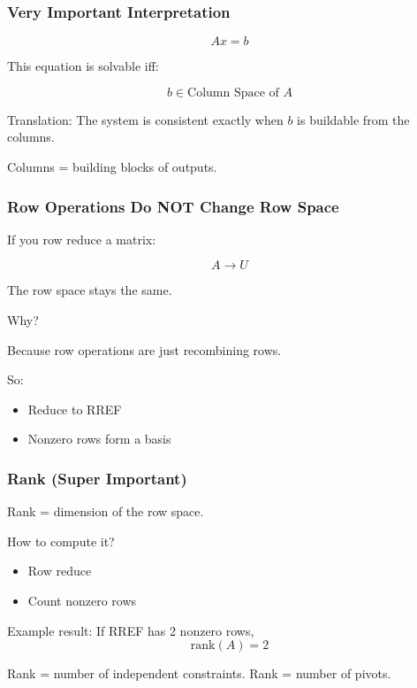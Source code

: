 \documentclass{beamer}
\begin{document}
\begin{frame}
\frametitle{Very Important Interpretation}

\[
Ax = b
\]

This equation is solvable iff:

\[
b \in \text{Column Space of } A
\]

Translation:
The system is consistent exactly when $b$ is buildable
from the columns.

Columns = building blocks of outputs.
\end{frame}

\begin{frame}
\frametitle{Row Operations Do NOT Change Row Space}

If you row reduce a matrix:

\[
A \to U
\]

The row space stays the same.

Why?

Because row operations are just recombining rows.

So:
\begin{itemize}
    \item Reduce to RREF
    \item Nonzero rows form a basis
\end{itemize}
\end{frame}

\begin{frame}
\frametitle{Rank (Super Important)}

Rank = dimension of the row space.

How to compute it?

\begin{itemize}
    \item Row reduce
    \item Count nonzero rows
\end{itemize}

Example result:
If RREF has 2 nonzero rows,
\[
\text{rank}(A) = 2
\]

Rank = number of independent constraints.
Rank = number of pivots.
\end{frame}
\end{document}
